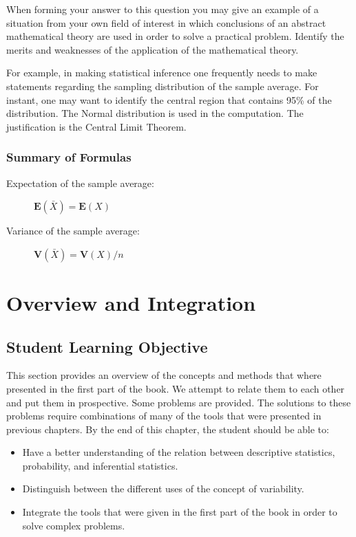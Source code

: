 \documentclass[
]{krantz}
\newcommand{\Expec}{\mathbf{E}}
\newcommand{\Var}{\mathbf{V}}
\theoremstyle{definition}
\theoremstyle{definition}
\theoremstyle{definition}
\theoremstyle{remark}
\begin{document}
When forming your answer to this question you may give an example of a
situation from your own field of interest in which conclusions of an
abstract mathematical theory are used in order to solve a practical
problem. Identify the merits and weaknesses of the application of the
mathematical theory.

For example, in making statistical inference one frequently needs to
make statements regarding the sampling distribution of the sample
average. For instant, one may want to identify the central region that
contains 95\% of the distribution. The Normal distribution is used in the
computation. The justification is the Central Limit Theorem.

\hypertarget{summary-of-formulas}{%
\subsection*{Summary of Formulas}\label{summary-of-formulas}}


\begin{description}
\item[Expectation of the sample average:]
\(\Expec(\bar X) = \Expec(X)\)
\item[Variance of the sample average:]
\(\Var(\bar X) = \Var(X)/n\)
\end{description}

\hypertarget{overview-and-integration}{%
\chapter{Overview and Integration}\label{overview-and-integration}}

\hypertarget{student-learning-objective-4}{%
\section{Student Learning Objective}\label{student-learning-objective-4}}

This section provides an overview of the concepts and methods that where
presented in the first part of the book. We attempt to relate them to
each other and put them in prospective. Some problems are provided. The
solutions to these problems require combinations of many of the tools
that were presented in previous chapters. By the end of this chapter,
the student should be able to:

\begin{itemize}
\item
  Have a better understanding of the relation between descriptive
  statistics, probability, and inferential statistics.
\item
  Distinguish between the different uses of the concept of
  variability.
\item
  Integrate the tools that were given in the first part of the book in
  order to solve complex problems.
\end{itemize}
\end{document}
